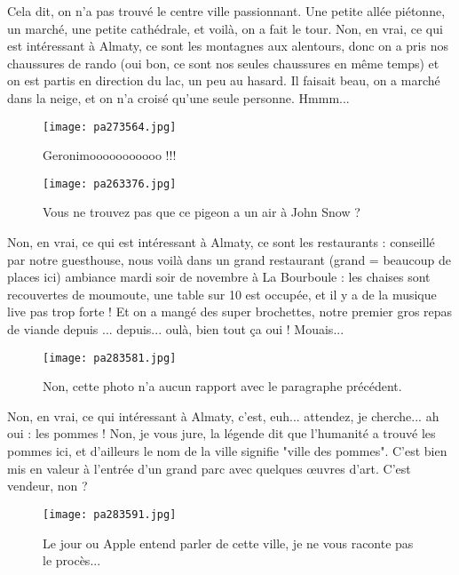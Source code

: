 \documentclass{book}
\begin{document}
Cela dit, on n'a pas trouvé le centre ville passionnant. Une petite allée piétonne, un marché, une petite cathédrale, et voilà, on a fait le tour. Non, en vrai, ce qui est intéressant à Almaty, ce sont les montagnes aux alentours, donc on a pris nos chaussures de rando (oui bon, ce sont nos seules chaussures en même temps) et on est partis en direction du lac, un peu au hasard. Il faisait beau, on a marché dans la neige, et on n'a croisé qu'une seule personne. Hmmm...


\begin{figure}[h]
\centering
\texttt{[image: pa273564.jpg]}
\caption*{Geronimooooooooooo !!!}
\end{figure}


\begin{figure}[h]
\centering
\texttt{[image: pa263376.jpg]}
\caption*{Vous ne trouvez pas que ce pigeon a un air à John Snow ?}
\end{figure}

Non, en vrai, ce qui est intéressant à Almaty, ce sont les restaurants : conseillé par notre guesthouse, nous voilà dans un grand restaurant (grand = beaucoup de places ici) ambiance mardi soir de novembre à La Bourboule : les chaises sont recouvertes de moumoute, une table sur 10 est occupée, et il y a de la musique live pas trop forte ! Et on a mangé des super brochettes, notre premier gros repas de viande depuis ... depuis... oulà, bien tout ça oui ! Mouais...


\begin{figure}[h]
\centering
\texttt{[image: pa283581.jpg]}
\caption*{Non, cette photo n'a aucun rapport avec le paragraphe précédent.}
\end{figure}

Non, en vrai, ce qui intéressant à Almaty, c'est, euh... attendez, je cherche... ah oui : les pommes ! Non, je vous jure, la légende dit que l'humanité a trouvé les pommes ici, et d'ailleurs le nom de la ville signifie "ville des pommes". C'est bien mis en valeur à l'entrée d'un grand parc avec quelques œuvres d'art. C'est vendeur, non ?


\begin{figure}[h]
\centering
\texttt{[image: pa283591.jpg]}
\caption*{Le jour ou Apple entend parler de cette ville, je ne vous raconte pas le procès...}
\end{figure}
\end{document}
